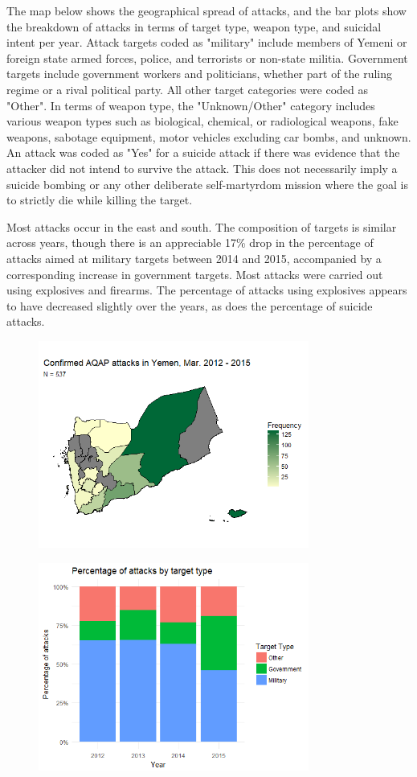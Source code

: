 \documentclass[letterpaper,12pt]{article}
\theoremstyle{definition}
\begin{document}
The map below shows the geographical spread of attacks, and the bar plots show the breakdown of attacks in terms of target type, weapon type, and suicidal intent per year. Attack targets coded as "military" include members of Yemeni or foreign state armed forces, police, and terrorists or non-state militia. Government targets include government workers and politicians, whether part of the ruling regime or a rival political party. All other target categories were coded as "Other". In terms of weapon type, the "Unknown/Other" category includes various weapon types such as biological, chemical, or radiological weapons, fake weapons, sabotage equipment, motor vehicles excluding car bombs, and unknown. An attack was coded as "Yes" for a suicide attack if there was evidence that the attacker did not intend to survive the attack. This does not necessarily imply a suicide bombing or any other deliberate self-martyrdom mission where the goal is to strictly die while killing the target.

Most attacks occur in the east and south. The composition of targets is similar across years, though there is an appreciable 17\% drop in the percentage of attacks aimed at military targets between 2014 and 2015, accompanied by a corresponding increase in government targets. Most attacks were carried out using explosives and firearms. The percentage of attacks using explosives appears to have decreased slightly over the years, as does the percentage of suicide attacks.

\begin{figure}[htb!]
  \includegraphics[width=3.5in]{attack_map.png}
\end{figure}

\begin{figure}[htb!]
  \includegraphics[width=3.5in]{attack_target.png}
\end{figure}
\end{document}
